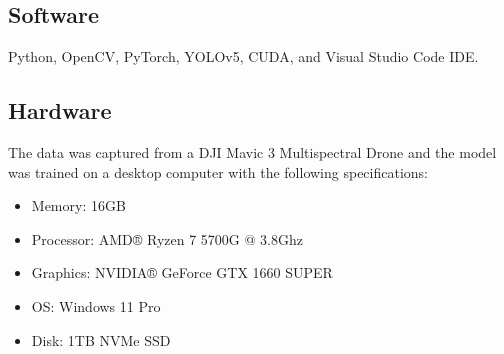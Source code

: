 \documentclass{report} %
\begin{document}
		\subsection{Software}
		Python, OpenCV, PyTorch, YOLOv5, CUDA, and Visual Studio Code IDE. 
		\subsection{Hardware}
		The data was captured from a DJI Mavic 3 Multispectral Drone and the model was trained on a desktop computer with the following specifications:
		\begin{itemize}
			\item Memory: 16GB
			\item Processor: AMD® Ryzen 7 5700G @ 3.8Ghz
			\item Graphics: NVIDIA® GeForce GTX 1660 SUPER
			\item OS: Windows 11 Pro
			\item Disk: 1TB NVMe SSD
		\end{itemize}
		
\end{document}
